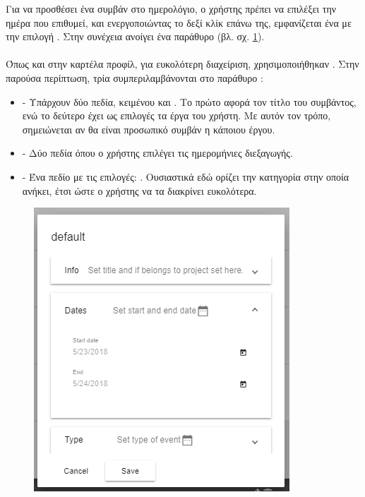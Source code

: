 \pSpace Για να προσθέσει ένα συμβάν στο ημερολόγιο, ο χρήστης πρέπει να επιλέξει την ημέρα που επιθυμεί, και ενεργοποιώντας το δεξί κλίκ επάνω της, εμφανίζεται ένα  με την επιλογή . Στην συνέχεια ανοίγει ένα  παράθυρο (βλ. σχ. \ref{fig:userCalendarCreateEvent}).\\ \\
\pSpace Όπως και στην καρτέλα προφίλ, για ευκολότερη διαχείριση, χρησιμοποιήθηκαν . Στην παρούσα περίπτωση, τρία  συμπεριλαμβάνονται στο παράθυρο :\\
\begin{itemize}
	\item {} - Υπάρχουν δύο πεδία, κειμένου και . Το πρώτο αφορά τον τίτλο του συμβάντος, ενώ το δεύτερο έχει ως επιλογές τα έργα του χρήστη. Με αυτόν τον τρόπο, σημειώνεται αν θα είναι προσωπικό συμβάν η κάποιου έργου.
	\item {} - Δύο πεδία όπου ο χρήστης επιλέγει τις ημερομήνιες διεξαγωγής.
	\item {} - Ένα πεδίο  με τις επιλογές: . Ουσιαστικά εδώ ορίζει την κατηγορία στην οποία ανήκει, έτσι ώστε ο χρήστης να τα διακρίνει ευκολότερα. 
\end{itemize}

\begin{figure}[!htb]
\centering
\includegraphics[scale=0.8]{images/userCalendarCreateEvent.png}
\caption{}
\label{fig:userCalendarCreateEvent}
\end{figure}

